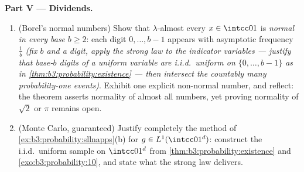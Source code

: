\begin{problem}
\medskip
\noindent\textbf{Part V --- Dividends.}
\begin{enumerate}[resume]
  \item (Borel's normal numbers) Show that
        $\lambda$-almost every $x \in \intcc01$ is
        \emph{normal in every base} $b \geq 2$: each digit
        $0, \dots, b-1$ appears with asymptotic frequency
        $\frac1b$ \emph{(fix $b$ and a digit, apply the
        strong law to the indicator variables --- justify
        that base-$b$ digits of a uniform variable are
        i.i.d.\ uniform on $\{0,\dots,b-1\}$ as in
        \cref{thm:b3:probability:existence} --- then
        intersect the countably many probability-one
        events)}. Exhibit one explicit non-normal number,
        and reflect: the theorem asserts normality of almost
        all numbers, yet proving normality of $\sqrt2$ or
        $\pi$ remains open.
  \item (Monte Carlo, guaranteed) Justify completely the
        method of \cref{ex:b3:probability:sllnapps}(b) for
        $g \in L^1(\intcc01^d)$: construct the i.i.d.\
        uniform sample on $\intcc01^d$ from
        \cref{thm:b3:probability:existence} and
        \cref{exo:b3:probability:10}, and state what the
        strong law delivers.
\end{enumerate}
\end{problem}
